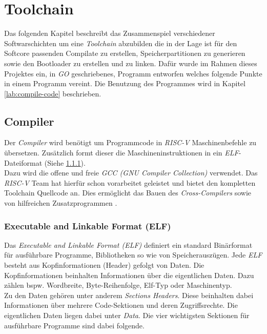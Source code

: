 \chapter{Toolchain}

    Das folgenden Kapitel beschreibt das Zusammenspiel verschiedener Softwarschichten
    um eine \textit{Toolchain} abzubilden die in der Lage ist für den Softcore passenden
    Compilate zu erstellen, Speicherpartitionen zu generieren sowie den Bootloader
    zu erstellen und zu linken.
    Dafür wurde im Rahmen dieses Projektes ein, in \textit{GO} geschriebenes, Programm
    entworfen welches folgende Punkte in einem Programm vereint.
    Die Benutzung des Programmes wird in Kapitel \ref{lab:compile-code} beschrieben.

    \section{Compiler}

        Der \textit{Compiler} wird benötigt um Programmcode
        in \textit{RISC-V} Maschinenbefehle zu übersetzen.
        Zusätzlich formt dieser die Maschineninstruktionen in ein \textit{ELF}-Dateiformat
        (Siehe \ref{lab:elf}).\\
        Dazu wird die offene und freie
        \textit{GCC (GNU Compiler Collection)} verwendet.
        Das \textit{RISC-V} Team hat hierfür schon vorarbeitet geleistet und bietet
        den kompletten Toolchain Quellcode an.
        Dies ermöglicht das Bauen des \textit{Cross-Compilers} sowie von hilfreichen
        Zusatzprogrammen \cite{riscv-toolchain}.
        
    \subsection{Executable and Linkable Format (ELF)}\label{lab:elf}
        Das \textit{Executable and Linkable Format (ELF)} definiert ein
        standard Binärformat für ausführbare Programme, Bibliotheken so wie von
        Speicherauszügen. Jede \textit{ELF} besteht aus Kopfinformationen (Header)
        gefolgt von Daten. Die Kopfinformationen beinhalten Informationen 
        über die eigentlichen Daten. Dazu zählen bspw. Wordbreite, Byte-Reihenfolge,
        Elf-Typ oder Maschinentyp.\\
        Zu den Daten gehören unter anderem \textit{Sections Headers}.
        Diese beinhalten dabei Informationen über mehrere Code-Sektionen
        und deren Zugriffsrechte. Die eigentlichen Daten liegen dabei unter \textit{Data}.
        Die vier wichtigsten Sektionen für ausführbare Programme sind dabei folgende.
        
